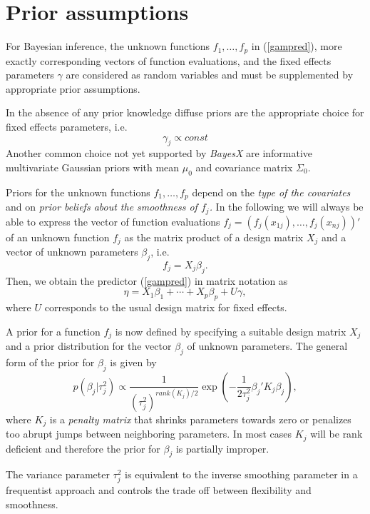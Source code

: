 \documentclass[11pt,a4paper,twoside]{bayesxarticle}
\begin{document}
\section{Prior assumptions}
\label{priorassumptions}

For Bayesian inference, the unknown functions $f_{1},\dots ,f_{p}$
in (\ref{gampred}), more exactly corresponding vectors of function
evaluations, and the fixed effects parameters $\gamma$ are
considered as random variables and must be supplemented by
appropriate prior assumptions.

In the absence of any prior knowledge diffuse priors are the
appropriate choice for fixed effects parameters, i.e.
$$
\gamma_j \propto const
$$
Another common choice not yet supported by {\em BayesX} are
informative multivariate Gaussian priors with mean $\mu_0$ and
covariance matrix $\Sigma_0$.


Priors for the unknown functions $f_{1},\dots,f_{p}$ depend on the
{\em type of the covariates} and on {\em prior beliefs about the
smoothness of $f_j$.} In the following we will always be able to
express the vector of function evaluations
$f_j=(f_j(x_{1j}),\dots,f_j(x_{nj}))'$ of an unknown function
$f_j$ as the matrix product of a design matrix $X_j$ and a vector
of unknown parameters $\beta_j$, i.e.
\begin{equation}
\label{matproduct} f_j=X_j \beta_j.
\end{equation}
Then, we obtain the predictor (\ref{gampred}) in matrix notation
as
\begin{equation}
\label{gampredmatrix} \eta = X_1 \beta_1 + \cdots + X_p \beta_p +
U \gamma,
\end{equation}
where $U$ corresponds to the usual design matrix for fixed
effects.

A prior for a function $f_j$ is now defined by specifying a
suitable design matrix $X_j$ and a prior distribution for the
vector $\beta_j$ of unknown parameters. The general form of the
prior for $\beta_j$ is given by
\begin{equation}
\label{genform} p(\beta_j | \tau_j^2) \propto
\frac{1}{(\tau^2_j)^{rank(K_j)/2}} \exp\left(-\frac{1}{2\tau_j^2}
\beta_j' K_j \beta_j\right),
\end{equation}
where $K_j$ is a {\em penalty matrix} that shrinks parameters
towards zero or penalizes too abrupt jumps between neighboring
parameters. In most cases $K_j$ will be rank deficient and
therefore the prior for $\beta_j$ is partially improper.

The variance parameter $\tau_j^2$ is  equivalent to the inverse
smoothing parameter in a frequentist approach and controls the
trade off between flexibility and smoothness.
\end{document}

